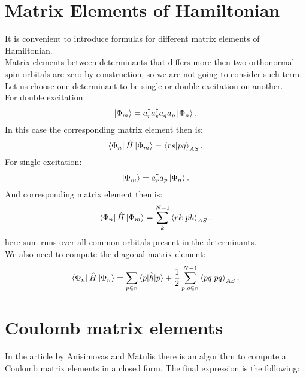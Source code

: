 \documentclass[twoside,english]{uiofysmaster}
\theoremstyle{definition}
\begin{document}
\chapter{Matrix Elements of Hamiltonian}\label{app:1}
It is convenient to introduce formulas for different matrix elements of Hamiltonian. \\
Matrix elements between determinants that differs more then two orthonormal spin orbitals are zero by construction, so we are not going to consider such term.\\
Let us choose one determinant to be single or double excitation on another. \\
For double excitation:
\begin{equation}
\ket{\Phi_{m}}=a^\dagger_r a^\dagger_s a_q a_p \ket{\Phi_n}.
\end{equation}
In this case the corresponding matrix element then is:
\begin{equation}
\bra{\Phi_n} \hat{H}\ket{\Phi_{m}}=\braket{rs|pq}_{AS}.
\end{equation}
For single excitation:
\begin{equation}
\ket{\Phi_{m}}=a^\dagger_r  a_p \ket{\Phi_n}.
\end{equation}
And corresponding matrix element then is:
\begin{equation}
\bra{\Phi_n} \hat{H}\ket{\Phi_{m}}=\sum_{k}^{N-1}\braket{rk|pk}_{AS}.
\end{equation}
here sum runs over all common orbitals present in the determinants.\\
We also need to compute the diagonal matrix element:
\begin{equation}
\bra{\Phi_n} \hat{H}\ket{\Phi_{n}}=\sum_{p\in n} \braket{p|\hat{h}|p} + \frac{1}{2} \sum_{p,q \in n}^{N-1}\braket{pq|pq}_{AS}.
\end{equation}

\chapter{Coulomb matrix elements}\label{app:2}
In the article by Anisimovas and Matulis \cite{anisimovasEnergySpectraFewelectron1998} there is an algorithm to compute a Coulomb matrix elements in a closed form. The final expression is the following:
\end{document}
